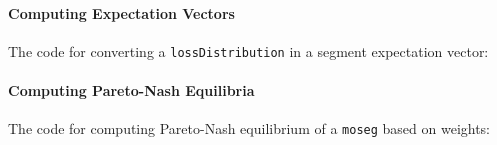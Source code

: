 \documentclass[a4paper]{scrreprt}
\begin{document}
    \paragraph{Computing Expectation Vectors}
    The code for converting a \texttt{lossDistribution} in a segment expectation vector:
    
    
    \paragraph{Computing Pareto-Nash Equilibria}
    The code for computing Pareto-Nash equilibrium of a \texttt{moseg} based on weights:
    
    
    
    
    \printbibliography
\end{document}
